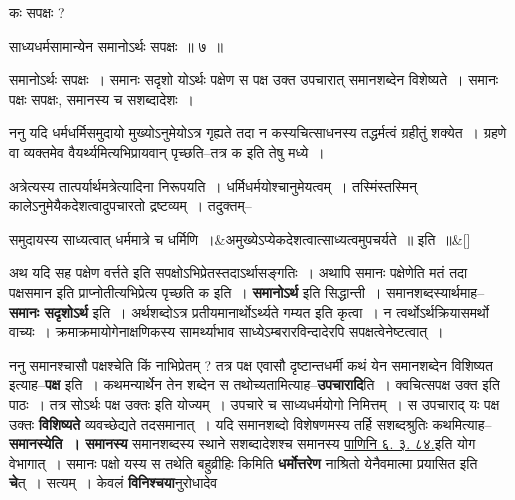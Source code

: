 \documentclass[article,12pt,a4paper]{memoir}
\begin{document}
	  \pstart कः सपक्षः ?
	\pend
        
	  \bigskip
	  \begingroup
	

	  \pstart साध्यधर्मसामान्येन समानोऽर्थः सपक्षः ॥ ७ ॥
	\pend
      
	  \endgroup
	 

	  \pstart समानोऽर्थः सपक्षः । समानः सदृशो योऽर्थः पक्षेण स पक्ष उक्त उपचारात् समानशब्देन विशेष्यते । समानः पक्षः सपक्षः, समानस्य च सशब्दादेशः ।
	\pend
      
	  \endgroup
	

	  \pstart ननु यदि धर्मधर्मिसमुदायो मुख्योऽनुमेयोऽत्र गृह्यते तदा न कस्यचित्साधनस्य तद्धर्मत्वं ग्रहीतुं शक्येत । ग्रहणे वा व्यक्तमेव वैयर्थ्यमित्यभिप्रायवान् पृच्छति--तत्र क इति तेषु मध्ये ।
	\pend
      

	  \pstart अत्रेत्यस्य तात्पर्यार्थमत्रेत्यादिना निरूपयति । धर्मिधर्मयोश्चानुमेयत्वम् । तस्मिंस्तस्मिन् कालेऽनुमेयैकदेशत्वादुपचारतो द्रष्टव्यम् । तदुक्तम्--
	\pend
      
	  \bigskip
	  \begingroup
	
	    
	    \stanza[\smallbreak]
	समुदायस्य साध्यत्वात् धर्ममात्रे च धर्मिणि ।&अमुख्येऽप्येकदेशत्वात्साध्यत्वमुपचर्यते ॥ इति ॥\&[\smallbreak]


	
	  \endgroup
	

	  \pstart अथ यदि सह पक्षेण वर्त्तते इति सपक्षोऽभिप्रेतस्तदाऽर्थासङ्गतिः । अथापि समानः पक्षेणेति मतं तदा पक्षसमान इति प्राप्नोतीत्यभिप्रेत्य पृच्छति क इति । \textbf{समानोऽर्थ} इति सिद्धान्ती । समानशब्दस्यार्थमाह--\textbf{समानः सदृशोऽर्थ} इति । अर्थशब्दोऽत्र प्रतीयमानार्थोऽर्थ्यते गम्यत इति कृत्वा । न त्वर्थोऽर्थक्रियासमर्थो वाच्यः । क्रमाक्रमायोगेनाक्षणिकस्य सामर्थ्याभाव साध्येऽम्बरारविन्दादेरपि सपक्षत्वेनेष्टत्वात् ।
	\pend
      

	  \pstart ननु समानश्चासौ पक्षश्चेति किं नाभिप्रेतम् ? तत्र पक्ष एवासौ दृष्टान्तधर्मी कथं येन समानशब्देन विशिष्यत इत्याह--\textbf{पक्ष} इति । कथमन्यार्थेन तेन शब्देन स तथोच्यतामित्याह--\textbf{उपचारादि}ति । क्वचित्सपक्ष उक्त इति पाठः । तत्र सोऽर्थः पक्ष उक्तः इति योज्यम् । उपचारे च साध्यधर्मयोगो निमित्तम् । स उपचाराद् यः पक्ष उक्तः \textbf{विशिष्यते} व्यवच्छेद्यते तदसमानात् । यदि समानशब्दो विशेषणमस्य तर्हि सशब्दश्रुतिः कथमित्याह--\textbf{समानस्येति । समानस्य} समानशब्दस्य स्थाने सशब्दादेशश्च समानस्य  \href{http://sarit.indology.info/?cref=Pā.6.3.84}{पाणिनि ६. ३. ८४.}इति योग वेभागात् । समानः पक्षो यस्य स तथेति बहुव्रीहिः किमिति \textbf{धर्मोत्तरेण} नाश्रितो येनैवमात्मा प्रयासित इति \textbf{चे}त् । सत्यम् । केवलं \textbf{विनिश्चया}नुरोधादेव  \leavevmode{} 
	  
\end{document}
